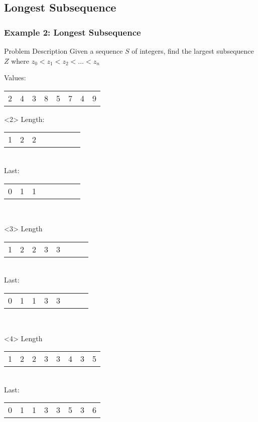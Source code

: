 \documentclass{beamer}
\begin{document}
\subsection{Longest Subsequence}
\begin{frame}
  \frametitle{Example 2: Longest Subsequence}
  \begin{block}{Problem Description}
    Given a sequence $S$ of integers, find the largest subsequence $Z$
    where $z_0 < z_1 < z_2 < \dots < z_n$
  \end{block}
  \bigskip

  Values:\\
  \begin{tabular}{cccccccc}
    2 & 4 & 3 & 8 & 5 & 7 & 4 & 9\\
  \end{tabular}
  
  \begin{onlyenv}<2>
    Length:\\
    \begin{tabular}{cccccccc}
      1 & 2 & 2 &  &  &  &  & \\
    \end{tabular}\\
    Last:\\
    \begin{tabular}{cccccccc}
      0 & 1 & 1 &  &  &  &  & \\
    \end{tabular}\\
  \end{onlyenv}
  \begin{onlyenv}<3>
    Length\\
    \begin{tabular}{cccccccc}
      1 & 2 & 2 & 3 & 3 &  &  & \\
    \end{tabular}\\
    Last:\\
    \begin{tabular}{cccccccc}
      0 & 1 & 1 & 3 & 3 &  &  & \\
    \end{tabular}\\
  \end{onlyenv}
  \begin{onlyenv}<4>
    Length\\
    \begin{tabular}{cccccccc}
      1 & 2 & 2 & 3 & 3 & 4 & 3 & 5 \\
    \end{tabular}\\
    Last:\\
    \begin{tabular}{cccccccc}
      0 & 1 & 1 & 3 & 3 & 5 & 3 & 6 \\
    \end{tabular}\\
  \end{onlyenv}
\end{frame}
\end{document}
